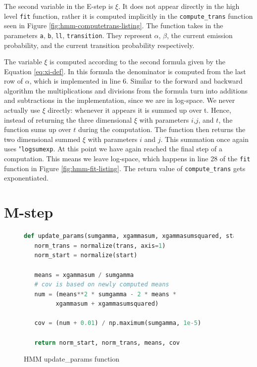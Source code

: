The second variable in the E-step is $\xi$. It does not appear directly in the high level \texttt{fit} function, rather it is computed implicitly in the \texttt{compute\_trans} function seen in Figure \ref{fig:hmm-computetrans-listing}. The function takes in the parameters \texttt{a}, \texttt{b}, \texttt{ll}, \texttt{transition}. They represent $\alpha$, $\beta$, the current emission probability, and the current transition probability respectively. 

The variable $\xi$ is computed according to the second formula given by the Equation \eqref{eq:xi-def}. In this formula the denominator is computed from the last row of $\alpha$, which is implemented in line 6. Similar to the forward and backward algorithm the multiplications and divisions from the formula turn into additions and subtractions in the implementation, since we are in log-space. 
We never actually use $\xi$ directly: whenever it appears it is summed up over t. Hence, instead of returning the three dimensional $\xi$ with parameters $i$,$j$, and $t$, the function sums up over $t$ during the computation. The function then returns the two dimensional summed $\xi$ with parameters $i$ and $j$. This summation once again uses "\texttt{logsumexp}. At this point we have again reached the final step of a computation. This means we leave log-space, which happens in line 28 of the \texttt{fit} function in Figure \ref{fig:hmm-fit-listing}. The return value of \texttt{compute\_trans} gets exponentiated. 

\section{M-step}

\begin{figure}
\begin{singlespace}
\begin{lstlisting}[language=Python]
def update_params(sumgamma, xgammasum, xgammasumsquared, start, trans):
   norm_trans = normalize(trans, axis=1)
   norm_start = normalize(start)

   means = xgammasum / sumgamma
   # cov is based on newly computed means
   num = (means**2 * sumgamma - 2 * means *
         xgammasum + xgammasumsquared)

   cov = (num + 0.01) / np.maximum(sumgamma, 1e-5)

   return norm_start, norm_trans, means, cov
\end{lstlisting}
\end{singlespace}
\caption{HMM update\_params function}    
\label{fig:hmm-updateparams-listing}
\end{figure}

